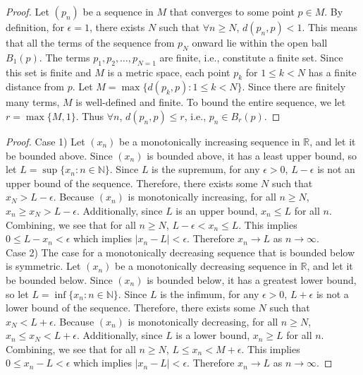 \documentclass[12pt]{article}
\newcommand{\bbN}{\mathbb{N}}
\newcommand{\bbR}{\mathbb{R}}
\renewcommand{\_}[1]{\underline{ #1 }}
\theoremstyle{definition}
\newenvironment{exercise}[1]
  {\renewcommand\theinnercustomthm{#1}\innercustomthm}
  {\endinnercustomthm}
\numberwithin{equation}{subsection}
\begin{document}
\begin{exercise}{7}
    \begin{proof}
        Let $(p_n)$ be a sequence in $M$ that converges to some point $p \in M$. By definition, for $\epsilon = 1$, there exists $N$ such that $\forall n \ge N$, $d(p_n, p) < 1$. This means that all the terms of the sequence from $p_N$ onward lie within the open ball $B_1(p)$. The terms $p_1, p_2, \dots, p_{N = 1}$ are finite, i.e., constitute a finite set. Since this set is finite and $M$ is a metric space, each point $p_k$ for $1 \le k < N$ has a finite distance from $p$. Let $M = \max \{ d(p_k, p) : 1 \le k < N \}$. Since there are finitely many terms, $M$ is well-defined and finite. To bound the entire sequence, we let $r = \max \{ M, 1 \}$. Thus $\forall n$, $d(p_n, p) \le r$, i.e., $p_n \in B_r (p)$.
    \end{proof}
\end{exercise}

\begin{exercise}{9}
    \begin{proof}
        Case 1) Let $(x_n)$ be a monotonically increasing sequence in $\bbR$, and let it be bounded above. Since $(x_n)$ is bounded above, it has a least upper bound, so let $L = \sup \{ x_n : n \in \bbN \}$. Since $L$ is the supremum, for any $\epsilon > 0$, $L - \epsilon$ is not an upper bound of the sequence. Therefore, there exists some $N$ such that $x_N > L - \epsilon$. Because $(x_n)$ is monotonically increasing, for all $n \ge N$, $x_n \ge x_N > L - \epsilon.$ Additionally, since $L$ is an upper bound, $x_n \le L$ for all $n$. Combining, we see that for all $n \ge N$, $L - \epsilon < x_n \le L$. This implies $0 \le L - x_n < \epsilon$ which implies $|x_n - L| < \epsilon$. Therefore $x_n \to L$ as $n \to \infty$. \\
        Case 2) The case for a monotonically decreasing sequence that is bounded below is symmetric. Let $(x_n)$ be a monotonically decreasing sequence in $\bbR$, and let it be bounded below. Since $(x_n)$ is bounded below, it has a greatest lower bound, so let $L = \inf \{ x_n : n \in \bbN \}$. Since $L$ is the infimum, for any $\epsilon > 0$, $L + \epsilon$ is not a lower bound of the sequence. Therefore, there exists some $N$ such that $x_N < L + \epsilon$. Because $(x_n)$ is monotonically decreasing, for all $n \ge N$, $x_n \le x_N < L + \epsilon.$ Additionally, since $L$ is a lower bound, $x_n \ge L$ for all $n$. Combining, we see that for all $n \ge N$, $L \le x_n < M + \epsilon$. This implies $0 \le x_n - L < \epsilon$ which implies $|x_n - L| < \epsilon$. Therefore $x_n \to L$ as $n \to \infty$.
    \end{proof}
\end{exercise}
\end{document}
